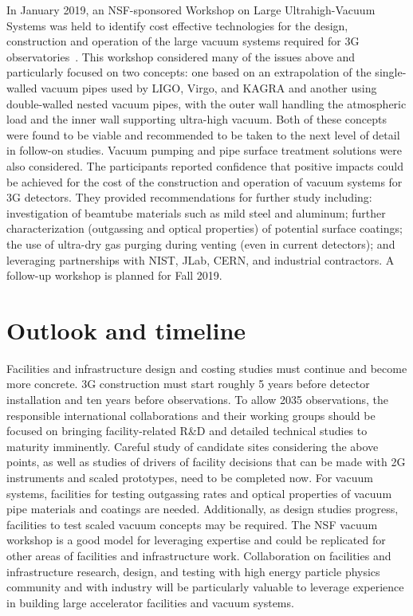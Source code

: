 In January 2019, an NSF-sponsored Workshop on Large Ultrahigh-Vacuum Systems was held to identify cost effective technologies for the design, construction and operation of the large vacuum systems required for 3G observatories~\cite{LLOVacWorkshop2019}. This workshop considered many of the issues above and particularly focused on two concepts: one based on an extrapolation of the single-walled vacuum pipes used by LIGO, Virgo, and KAGRA and another using double-walled nested vacuum pipes, with the outer wall handling the atmospheric load and the inner wall supporting ultra-high vacuum. Both of these concepts were found to be viable and recommended to be taken to the next level of detail in follow-on studies. Vacuum pumping and pipe surface treatment solutions were also considered. The participants reported confidence that positive impacts could be achieved for the cost of the construction and operation of vacuum systems for 3G detectors. They provided recommendations for further study including: investigation of beamtube materials such as mild steel and aluminum; further characterization (outgassing and optical properties) of potential surface coatings; the use of ultra-dry gas purging during venting (even in current detectors); and leveraging partnerships with NIST, JLab, CERN, and industrial contractors. A follow-up workshop is planned for Fall 2019.

\section{Outlook and timeline}
Facilities and infrastructure design and costing studies must continue and become more concrete. 3G construction must start roughly 5 years before detector installation and ten years before observations. To allow 2035 observations, the responsible international collaborations and their working groups should be focused on bringing facility-related R\&D and detailed technical studies to maturity imminently.
Careful study of candidate sites considering the above points, as well as studies of drivers of facility decisions that can be made with 2G instruments and scaled prototypes, need to be completed now. For vacuum systems, facilities for testing outgassing rates and optical properties of vacuum pipe materials and coatings are needed. Additionally, as design studies progress, facilities to test scaled vacuum concepts may be required.
The NSF vacuum workshop is a good model for leveraging expertise and could be replicated for other areas of facilities and infrastructure work.
Collaboration on facilities and infrastructure research, design, and testing with high energy particle physics community and with industry will be particularly valuable to leverage experience in building large accelerator facilities and vacuum systems.

